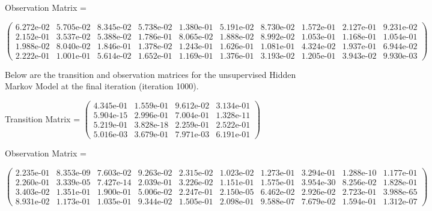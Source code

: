 Observation Matrix =

\small
$\begin{pmatrix}
6.272\text{e-}02 & 5.705\text{e-}02 & 8.345\text{e-}02 & 5.738\text{e-}02 & 1.380\text{e-}01 & 5.191\text{e-}02 & 8.730\text{e-}02 & 1.572\text{e-}01 & 2.127\text{e-}01 & 9.231\text{e-}02\\
2.152\text{e-}01 & 3.537\text{e-}02 & 5.388\text{e-}02 & 1.786\text{e-}01 & 8.065\text{e-}02 & 1.888\text{e-}02 & 8.992\text{e-}02 & 1.053\text{e-}01 & 1.168\text{e-}01 & 1.054\text{e-}01\\
1.988\text{e-}02 & 8.040\text{e-}02 & 1.846\text{e-}01 & 1.378\text{e-}02 & 1.243\text{e-}01 & 1.626\text{e-}01 & 1.081\text{e-}01 & 4.324\text{e-}02 & 1.937\text{e-}01 & 6.944\text{e-}02\\
2.222\text{e-}01 & 1.001\text{e-}01 & 5.614\text{e-}02 & 1.652\text{e-}01 & 1.169\text{e-}01 & 1.376\text{e-}01 & 3.193\text{e-}02 & 1.205\text{e-}01 & 3.943\text{e-}02 & 9.930\text{e-}03 
\end{pmatrix}$
\normalsize
\medskip

Below are the transition and observation matrices for the unsupervised Hidden Markov Model at the final iteration (iteration 1000).

Transition Matrix = \small $\begin{pmatrix}
    4.345\text{e-}01 & 1.559\text{e-}01 & 9.612\text{e-}02 & 3.134\text{e-}01\\
    5.904\text{e-}15 & 2.996\text{e-}01 & 7.004\text{e-}01 & 1.328\text{e-}11\\
    5.219\text{e-}01 & 3.828\text{e-}18 & 2.259\text{e-}01 & 2.522\text{e-}01\\
    5.016\text{e-}03 & 3.679\text{e-}01 & 7.971\text{e-}03 & 6.191\text{e-}01 
\end{pmatrix}$ 
\normalsize

Observation Matrix =

\small
$\begin{pmatrix}
    2.235\text{e-}01 & 8.353\text{e-}09 & 7.603\text{e-}02 & 9.263\text{e-}02 & 2.315\text{e-}02 & 1.023\text{e-}02 & 1.273\text{e-}01 & 3.294\text{e-}01 & 1.288\text{e-}10 & 1.177\text{e-}01\\ 
    2.260\text{e-}01 & 3.339\text{e-}05 & 7.427\text{e-}14 & 2.039\text{e-}01 & 3.226\text{e-}02 & 1.151\text{e-}01 & 1.575\text{e-}01 & 3.954\text{e-}30 & 8.256\text{e-}02 & 1.828\text{e-}01\\  
    3.403\text{e-}02 & 1.351\text{e-}01 & 1.900\text{e-}01 & 5.006\text{e-}02 & 2.247\text{e-}01 & 2.150\text{e-}05 & 6.462\text{e-}02 & 2.926\text{e-}02 & 2.723\text{e-}01 & 3.988\text{e-}65\\   
    8.931\text{e-}02 & 1.173\text{e-}01 & 1.035\text{e-}01 & 9.344\text{e-}02 & 1.505\text{e-}01 & 2.098\text{e-}01 & 9.588\text{e-}07 & 7.679\text{e-}02 & 1.594\text{e-}01 & 1.312\text{e-}07   
\end{pmatrix}$
\normalsize
\medskip

